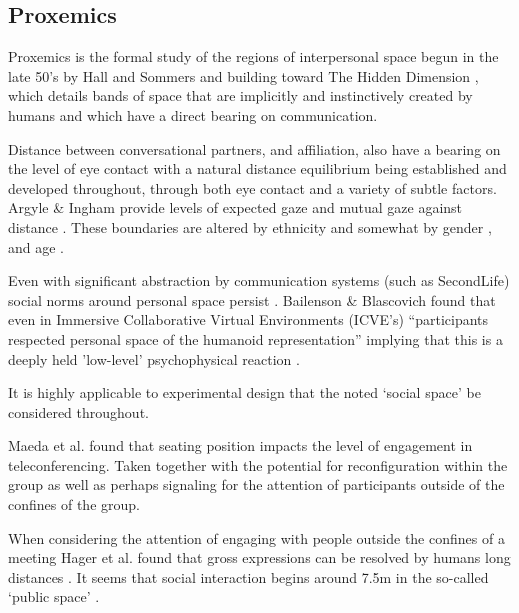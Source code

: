 \subsection{Proxemics}
Proxemics is the formal study of the regions of interpersonal space begun in the late 50's by Hall and Sommers and building toward The Hidden Dimension \cite{Hall1969}, which details bands of space that are implicitly and instinctively created by humans and which have a direct bearing on communication.\par
Distance between conversational partners, and affiliation, also have a bearing on the level of eye contact \cite{Argyle1965} with a natural distance equilibrium being established and developed throughout, through both eye contact and a variety of subtle factors. Argyle \& Ingham provide levels of expected gaze and mutual gaze against distance \cite{Argyle1969}. These boundaries are altered by ethnicity \cite{Watson1966, Argyle} and somewhat by gender \cite{Bruno2013}, and age \cite{Slessor2008, Hofmann20061683}.\par
Even with significant abstraction by communication systems (such as SecondLife) social norms around personal space persist \cite{Yee2007, 6790745, bailenson2003interpersonal}. Bailenson \& Blascovich found that even in Immersive Collaborative Virtual Environments (ICVE's) ``participants respected personal space of the humanoid representation''\cite{6790745} implying that this is a deeply held 'low-level' psychophysical reaction \cite{Blascovich2002}.\par
It is highly applicable to experimental design that the noted `social space' be considered throughout.\par
Maeda et al. \cite{Maeda2004} found that seating position impacts the level of engagement in teleconferencing. Taken together with the potential for reconfiguration within the group as well as perhaps signaling for the attention of participants outside of the confines of the group.\par
When considering the attention of engaging with people outside the confines of a meeting Hager et al. found that gross expressions can be resolved by humans long distances \cite{Hager1979, Argyle}. It seems that social interaction begins around 7.5m in the so-called `public space' \cite{Hall1969}.\par                
